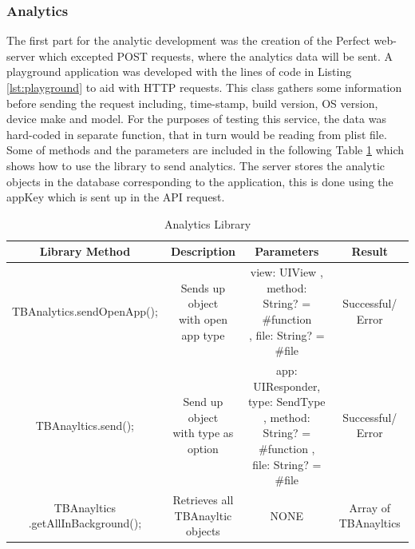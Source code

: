 \subsubsection{Analytics}

The first part for the analytic development was the creation of the Perfect web-server which excepted POST requests, where the analytics data will be sent. A playground application was developed with the lines of code in Listing \ref{lst:playground} to aid with HTTP requests. This class gathers some information before sending the request including, time-stamp, build version, OS version, device make and model. For the purposes of testing this service, the data was hard-coded in separate function, that in turn would be reading from plist file. Some of methods and the parameters are included in the following Table \ref{table:mob_analytics} which shows how to use the library to send analytics. The server stores the analytic objects in the database corresponding to the application, this is done using the appKey which is sent up in the API request.

\begin{table}[!h]
\centering
\caption{Analytics Library}
\label{table:mob_analytics}
\begin{tabular}{|c|c|c|c|}
\hline
\rowcolor{green!20}
Library Method                    & Description                        & Parameters    & Result              \\ 
\hline
TBAnalytics.sendOpenApp();        & \makecell{Sends up object\\ with open app type} &   \makecell{view: UIView , \\ method: String? = \#function \\ , file: String? = \#file } & Successful/ Error   \\ 
\hline
TBAnayltics.send();               & \makecell{Send up object \\ with type as option} &  \makecell{ app: UIResponder, \\ type: SendType \\ , method: String? = \#function ,  \\ file: String? = \#file } & Successful/ Error   \\ 
\hline
 \makecell{ TBAnayltics \\.getAllInBackground(); } & \makecell{Retrieves all \\ TBAnayltic objects }   & NONE        & Array of TBAnayltics \\ 
\hline
\end{tabular}%
\end{table}

